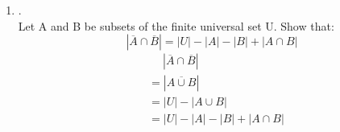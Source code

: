 \documentclass{article}
\theoremstyle{definition}
\theoremstyle{plain}
\begin{document}
\begin {enumerate}[itemindent=30pt,label=\bf Exercise {\arabic*}:]
$$|A \cup B \cup C|\;=\;|A|+|B|+|C|-|A \cap B|-|A \cap C|-|B \cap C| + |A \cap B \cap C|$$
\begin{align*}
	&\quad\; |A \cup B \cup C|\\
	&=|A \cup (B \cup C)|\\
	&=|A|+ |B \cup C| - |A \cap (B \cup C)|\\
	&=|A|+ |B \cup C| - |(A \cap B) \cup  (A \cap C)|\\
	&=|A|+ |B \cup C| - |A \cap B|  -  |A \cap C| + |A \cap B \cap C|\\
	&=|A|+|B|+|C|-|A \cap B|-|A \cap C|-|B \cap C| + |A \cap B \cap C|
\end{align*}
\item .\\
Let A and B be subsets of the finite universal set U. Show that: $$| \overline{A} \cap \overline{B}| = |U| - |A| -|B| + |A \cap B|$$
\begin{align*}
	&\quad\;| \overline{A} \cap \overline{B}|\\
	&=|\overline{A \cup B}|\\
	&=|U| - |A \cup B|\\
	&=|U| - |A| -|B| + |A \cap B|\\
\end{align*}

\end{enumerate}
\end{document}
